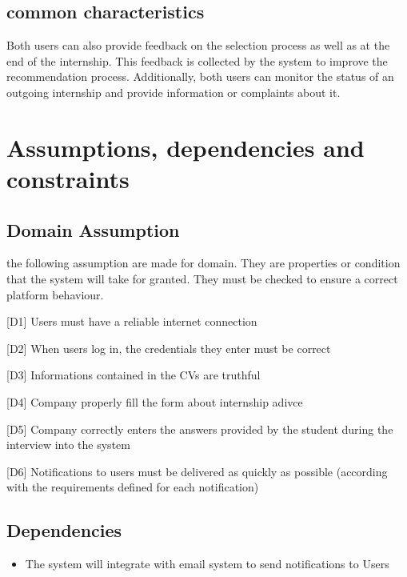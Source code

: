 		\subsection{common characteristics}
			Both users can also provide feedback on the selection process as well as at the end of the internship. This feedback is collected by the system to improve the recommendation process. Additionally, both users can monitor the status of an outgoing internship and provide information or complaints about it.
		
	\section{Assumptions, dependencies and constraints}
		\subsection{Domain Assumption}
			the following assumption are made for domain. They are properties or condition that the system will take for granted. They must be checked to ensure a correct platform behaviour.
			
			[D1] Users must have a reliable internet connection
			
			[D2] When users log in, the credentials they enter must be correct
			
			[D3] Informations contained in the CVs are truthful
			
			[D4] Company properly fill the form about internship adivce
			
			[D5] Company correctly enters the answers provided by the student during the interview into the system
			
			[D6] Notifications to users must be delivered as quickly as possible (according with the requirements defined for each notification)
			
		\subsection{Dependencies}
			\begin{itemize}
				\item The system will integrate with email system to send notifications to Users
			\end{itemize}
		
